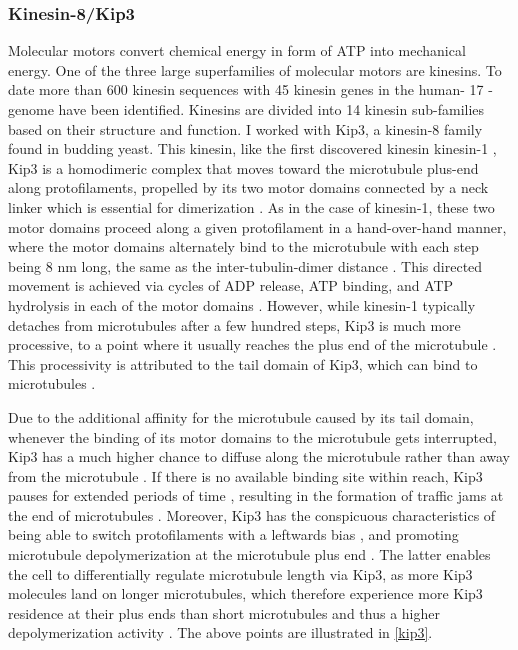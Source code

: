 \subsubsection{Kinesin-8/Kip3}
\label{sec:kip3_intro}
Molecular motors convert chemical energy in form of ATP into mechanical energy. One of the three large superfamilies of molecular motors are kinesins. To date more than 600 kinesin sequences with 45 kinesin genes in the human- 17 -genome \parencite{Endow3420} have been identified. Kinesins are divided into 14 kinesin sub-families based on their structure and function. I worked with Kip3, a kinesin-8 family found in budding yeast. This kinesin, like the first discovered kinesin kinesin-1 \parencite{Endow3420}, Kip3 is a homodimeric complex that moves toward the microtubule plus-end along protofilaments, propelled by its two motor domains connected by a neck linker which is essential for dimerization \parencite{Lin2020}. As in the case of kinesin-1, these two motor domains proceed along a given protofilament in a hand-over-hand manner, where the motor domains alternately bind to the microtubule with each step being 8 nm long, the same as the inter-tubulin-dimer distance \parencite{Xie2021}. This directed movement is achieved via cycles of ADP release, ATP binding, and ATP hydrolysis in each of the motor domains \parencite{Xie2021}. However, while kinesin-1 typically detaches from microtubules after a few hundred steps, Kip3 is much more processive, to a point where it usually reaches the plus end of the microtubule \parencite{Varga2009}. This processivity is attributed to the tail domain of Kip3, which can bind to microtubules \parencite{SU2011751}.\par

Due to the additional affinity for the microtubule caused by its tail domain, whenever the binding of its motor domains to the microtubule gets interrupted, Kip3 has a much higher chance to diffuse along the microtubule rather than away from the microtubule \parencite{Xie2021}. If there is no available binding site within reach, Kip3 pauses for extended periods of time \parencite{Varga2009}, resulting in the formation of traffic jams at the end of microtubules \parencite{Leduc2012}. Moreover, Kip3 has the conspicuous characteristics of being able to switch protofilaments with a leftwards bias \parencite{Bormuth2012}, and promoting microtubule depolymerization at the microtubule plus end \parencite{Lin2020}. The latter enables the cell to differentially regulate microtubule length via Kip3, as more Kip3 molecules land on longer microtubules, which therefore experience more Kip3 residence at their plus ends than short microtubules and thus a higher depolymerization activity \parencite{Varga2009}. The above points are illustrated in \autoref{kip3}.\par

